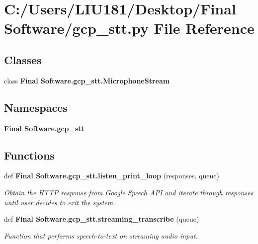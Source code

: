 \section{C\+:/\+Users/\+L\+I\+U181/\+Desktop/\+Final Software/gcp\+\_\+stt.py File Reference}
\label{gcp__stt_8py}
\subsection*{Classes}
\begin{DoxyCompactItemize}
\item 
class \textbf{ Final Software.\+gcp\+\_\+stt.\+Microphone\+Stream}
\end{DoxyCompactItemize}
\subsection*{Namespaces}
\begin{DoxyCompactItemize}
\item 
 \textbf{ Final Software.\+gcp\+\_\+stt}
\end{DoxyCompactItemize}
\subsection*{Functions}
\begin{DoxyCompactItemize}
\item 
def \textbf{ Final Software.\+gcp\+\_\+stt.\+listen\+\_\+print\+\_\+loop} (responses, queue)
\begin{DoxyCompactList}\small\item\em Obtain the H\+T\+TP response from Google Speech A\+PI and iterate through responses until user decides to exit the system. \end{DoxyCompactList}\item 
def \textbf{ Final Software.\+gcp\+\_\+stt.\+streaming\+\_\+transcribe} (queue)
\begin{DoxyCompactList}\small\item\em Function that performs speech-\/to-\/text on streaming audio input. \end{DoxyCompactList}\end{DoxyCompactItemize}
